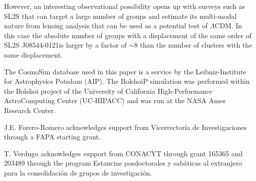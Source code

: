 \documentclass{emulateapj}
\newcommand{\bullg}{SL2S J08544-0121}
\begin{document}
However, an interesting observational possibility opens up with
surveys such as SL2S that can target a large number of groups and
estimate its multi-modal nature from lensing analysis that can be used
as a potential test of $\Lambda$CDM. In this case the absolute number
of groups with a displacement of the same order of \bullg is larger by
a factor of $\sim 8$ than the number of clusters with the same
displacement. 

The CosmoSim database used in this paper is a service by the
Leibniz-Institute for Astrophysics Potsdam (AIP). The  BolshoiP
simulation was performed within the Bolshoi project of the University
of California High-Performance  AstroComputing Center (UC-HIPACC) and
was run at the NASA Ames Research Center. 

J.E. Forero-Romero acknowledges support from Vicerrector\'ia de
Investigaciones through a FAPA starting grant.

T. Verdugo acknowledges support from CONACYT through grant 165365 and
203489 through the program Estancias posdoctorales y sab\'aticas al
extranjero para la consolidaci\'on de grupos de investigaci\'on.  


 
\end{document}
